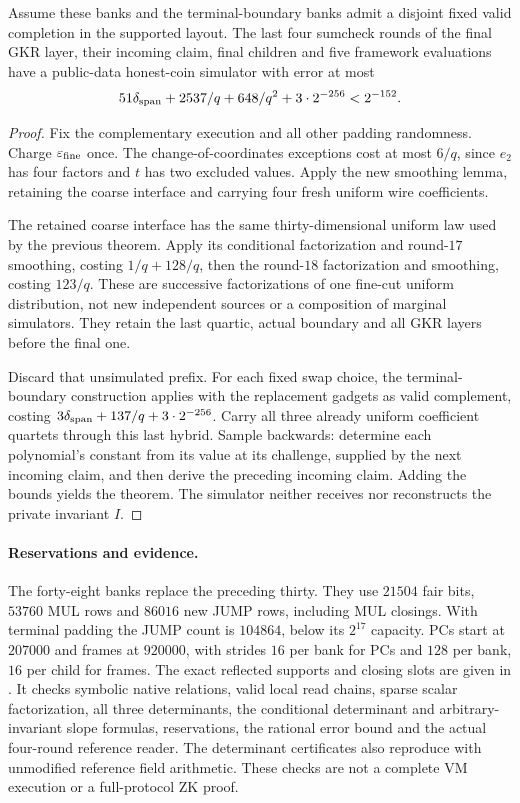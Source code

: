 \begin{theorem}
Assume these banks and the terminal-boundary banks admit a disjoint fixed valid completion in the supported layout. The last four sumcheck rounds of the final GKR layer, their incoming claim, final children and five framework evaluations have a public-data honest-coin simulator with error at most
\[
 51\delta_{\rm span}+2537/q+648/q^2+3\cdot2^{-256}<2^{-152}.
\]
\end{theorem}
\begin{proof}
Fix the complementary execution and all other padding randomness. Charge $\varepsilon_{\rm fine}$ once. The change-of-coordinates exceptions cost at most $6/q$, since $e_2$ has four factors and $t$ has two excluded values. Apply the new smoothing lemma, retaining the coarse interface and carrying four fresh uniform wire coefficients.

The retained coarse interface has the same thirty-dimensional uniform law used by the previous theorem. Apply its conditional factorization and round-$17$ smoothing, costing $1/q+128/q$, then the round-$18$ factorization and smoothing, costing $123/q$. These are successive factorizations of one fine-cut uniform distribution, not new independent sources or a composition of marginal simulators. They retain the last quartic, actual boundary and all GKR layers before the final one.

Discard that unsimulated prefix. For each fixed swap choice, the terminal-boundary construction applies with the replacement gadgets as valid complement, costing $3\delta_{\rm span}+137/q+3\cdot2^{-256}$. Carry all three already uniform coefficient quartets through this last hybrid. Sample backwards: determine each polynomial's constant from its value at its challenge, supplied by the next incoming claim, and then derive the preceding incoming claim. Adding the bounds yields the theorem. The simulator neither receives nor reconstructs the private invariant $I$.
\end{proof}

\paragraph{Reservations and evidence.} The forty-eight banks replace the preceding thirty. They use $21504$ fair bits, $53760$ MUL rows and $86016$ new JUMP rows, including MUL closings. With terminal padding the JUMP count is $104864$, below its $2^{17}$ capacity. PCs start at $207000$ and frames at $920000$, with strides $16$ per bank for PCs and $128$ per bank, $16$ per child for frames. The exact reflected supports and closing slots are given in . It checks symbolic native relations, valid local read chains, sparse scalar factorization, all three determinants, the conditional determinant and arbitrary-invariant slope formulas, reservations, the rational error bound and the actual four-round reference reader. The determinant certificates also reproduce with unmodified reference field arithmetic. These checks are not a complete VM execution or a full-protocol ZK proof.

